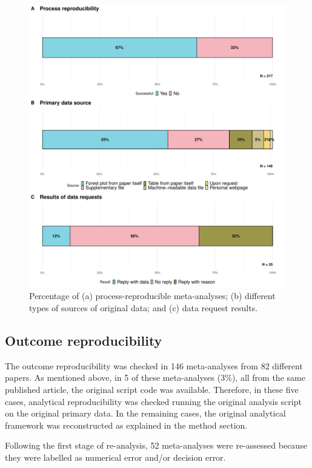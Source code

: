 \documentclass[
  ,jou, a4paper,floatsintext]{apa6}
\begin{document}
\begin{figure}
\includegraphics[width=1\linewidth]{manuscript_files/figure-latex/unnamed-chunk-3-1} \caption{Percentage of (a) process-reproducible meta-analyses; (b) different types of sources of original data; and (c) data request results.}\label{fig:unnamed-chunk-3}
\end{figure}

\hypertarget{outcome-reproducibility}{%
\subsection{Outcome reproducibility}\label{outcome-reproducibility}}

The outcome reproducibility was checked in 146 meta-analyses from 82 different papers. As mentioned above, in 5 of these meta-analyses (3\%), all from the same published article, the original script code was available. Therefore, in these five cases, analytical reproducibility was checked running the original analysis script on the original primary data. In the remaining cases, the original analytical framework was reconstructed as explained in the method section.

Following the first stage of re-analysis, 52 meta-analyses were re-assessed because they were labelled as numerical error and/or decision error.
\end{document}
